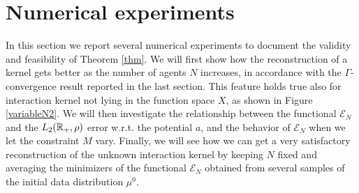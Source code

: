 
\section{Numerical experiments}\label{sec:num}
%
%
%

In this section we report several numerical experiments to document the validity and feasibility of Theorem \ref{thm}. We will first show how the reconstruction of a kernel gets better as the number of agents $N$ increases, in accordance with the $\Gamma$-convergence result reported in the last section. This feature holds true also for interaction kernel not lying in the function space $X$, as shown in Figure \ref{variableN2}. We will then investigate the relationship between the functional $\mathcal E_N$ and the $L_2(\mathbb{R}_+,\rho)$ error w.r.t. the potential $a$, and the behavior of $\mathcal E_N$ when we let the constraint $M$ vary. Finally, we will see how we can get a very satisfactory reconstruction of the unknown interaction kernel by keeping $N$ fixed and averaging the minimizers of the functional $\mathcal E_N$ obtained from several samples of the initial data distribution $\mu^0$.

